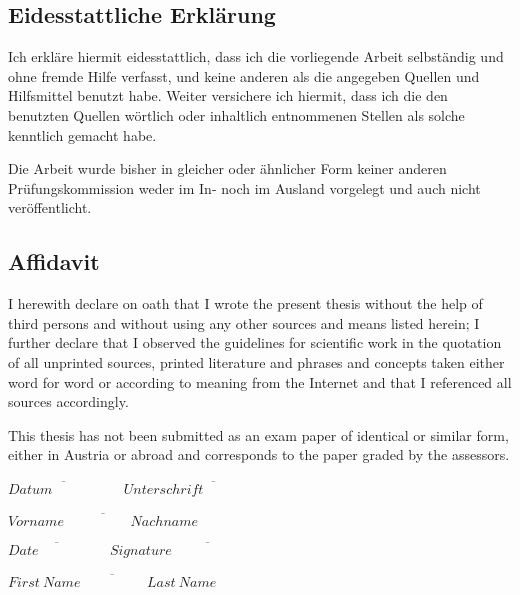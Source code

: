 
\ifmmtlanguagegerman
\subsection*{Eidesstattliche Erklärung}


Ich erkläre hiermit eidesstattlich, dass  ich  die vorliegende Arbeit selbständig  und ohne fremde Hilfe verfasst, und keine  anderen  als die angegeben Quellen und  Hilfsmittel benutzt  habe. Weiter versichere ich hiermit, dass ich   die den benutzten Quellen  wörtlich oder inhaltlich entnommenen Stellen als solche kenntlich gemacht habe.

Die Arbeit wurde bisher in gleicher oder ähnlicher Form keiner anderen Prüfungskommission weder im In- noch im Ausland vorgelegt und auch nicht veröffentlicht.

\else

\subsection*{Affidavit}

I herewith declare on oath that I wrote the present thesis without the help of third persons and without using any other sources and means listed herein; I further declare that I observed the guidelines for scientific work in the quotation of all unprinted sources, printed literature and phrases and concepts taken either word for word or according to meaning from the Internet and that I referenced all sources accordingly.

This thesis has not been submitted as an exam paper of identical or similar form, either in Austria or abroad and corresponds to the paper graded by the assessors.

\fi

\vspace*{3cm}



\hfill

\ifmmtlanguagegerman
$\overline{Datum \hspace{2cm}}$ \hfill $\overline{{Unterschrift}\hspace{3cm}}$

\vspace*{1cm}

\hfill $\overline{{Vorname\hspace{2cm}Nachname}}$
 
 \else
 $\overline{Date \hspace{2cm}}$ \hfill $\overline{{Signature}\hspace{4cm}}$

\vspace*{1cm}

 \hfill $\overline{{First~Name\hspace{2cm}Last~Name}}$
 \fi

